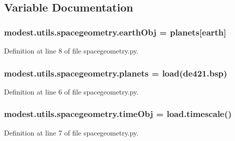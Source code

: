 \subsection{Variable Documentation}
\subsubsection[{\texorpdfstring{earth\+Obj}{earthObj}}]{\setlength{\rightskip}{0pt plus 5cm}modest.\+utils.\+spacegeometry.\+earth\+Obj = {\bf planets}\mbox{[}\textquotesingle{}earth\textquotesingle{}\mbox{]}}\hypertarget{namespacemodest_1_1utils_1_1spacegeometry_a5e817563041c43da2d36d223bade1512}{}\label{namespacemodest_1_1utils_1_1spacegeometry_a5e817563041c43da2d36d223bade1512}


Definition at line 8 of file spacegeometry.\+py.

\subsubsection[{\texorpdfstring{planets}{planets}}]{\setlength{\rightskip}{0pt plus 5cm}modest.\+utils.\+spacegeometry.\+planets = load(\textquotesingle{}de421.\+bsp\textquotesingle{})}\hypertarget{namespacemodest_1_1utils_1_1spacegeometry_a2aa86c4eec1470b4c2a8abf26189068a}{}\label{namespacemodest_1_1utils_1_1spacegeometry_a2aa86c4eec1470b4c2a8abf26189068a}


Definition at line 6 of file spacegeometry.\+py.

\subsubsection[{\texorpdfstring{time\+Obj}{timeObj}}]{\setlength{\rightskip}{0pt plus 5cm}modest.\+utils.\+spacegeometry.\+time\+Obj = load.\+timescale()}\hypertarget{namespacemodest_1_1utils_1_1spacegeometry_a4599db8252172dbf742cbd65616b3bee}{}\label{namespacemodest_1_1utils_1_1spacegeometry_a4599db8252172dbf742cbd65616b3bee}


Definition at line 7 of file spacegeometry.\+py.

